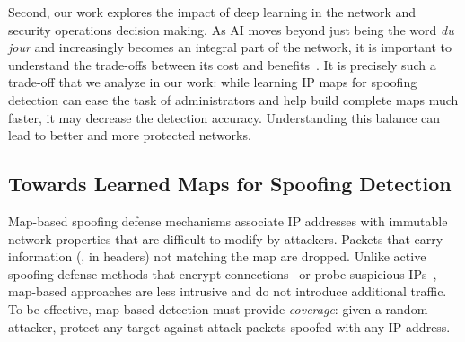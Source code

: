 Second, our work explores the impact of deep learning in the network and security operations decision making. As AI moves beyond just being the word {\em du jour} and increasingly becomes an integral part of the network, it is important to understand the trade-offs between its cost and benefits~\citep{vern}.
%
It is precisely such a trade-off that we analyze in our work: while learning IP maps for spoofing detection can ease the task of administrators and help build complete maps much faster, it may decrease the detection accuracy. Understanding this balance can lead to better and more protected networks.


\subsection{Towards Learned Maps for Spoofing Detection}


Map-based spoofing defense mechanisms associate IP addresses with immutable network properties that are difficult to modify by attackers. Packets that carry information (\ie{}, in headers) not matching the map are dropped. Unlike active spoofing defense methods that encrypt connections~\citep{ipsec} or probe suspicious IPs~\citep{puzzles}, map-based approaches are less intrusive and do not introduce additional traffic.
%
To be effective, map-based detection must provide {\em coverage}: given a random attacker, protect any target against attack packets spoofed with any IP address.
%

